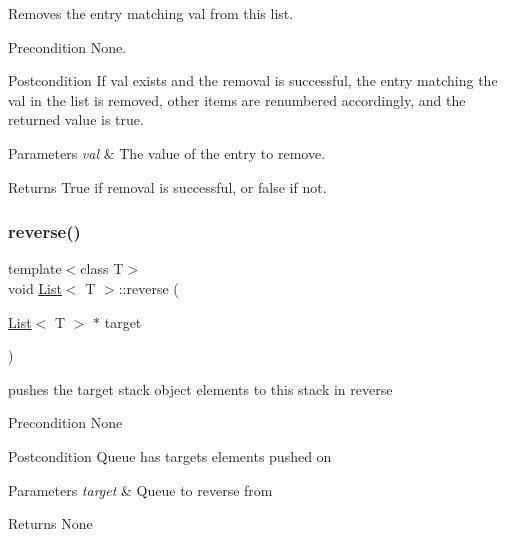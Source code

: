 Removes the entry matching val from this list. \begin{DoxyPrecond}{Precondition}
None. 
\end{DoxyPrecond}
\begin{DoxyPostcond}{Postcondition}
If val exists and the removal is successful, the entry matching the val in the list is removed, other items are renumbered accordingly, and the returned value is true. 
\end{DoxyPostcond}

\begin{DoxyParams}{Parameters}
{\em val} & The value of the entry to remove. \\
\hline
\end{DoxyParams}
\begin{DoxyReturn}{Returns}
True if removal is successful, or false if not. 
\end{DoxyReturn}
\mbox{\label{class_list_ac17012219fedb7d746f5c13501af164e}} 
\subsubsection{\texorpdfstring{reverse()}{reverse()}}
{\footnotesize\ttfamily template$<$class T$>$ \\
void \hyperlink{class_list}{List}$<$ T $>$\+::reverse (\begin{DoxyParamCaption}\item[{\hyperlink{class_list}{List}$<$ T $>$ $\ast$}]{target }\end{DoxyParamCaption})}

pushes the target stack object elements to this stack in reverse \begin{DoxyPrecond}{Precondition}
None 
\end{DoxyPrecond}
\begin{DoxyPostcond}{Postcondition}
Queue has target\textquotesingle{}s elements pushed on 
\end{DoxyPostcond}

\begin{DoxyParams}{Parameters}
{\em target} & Queue to reverse from \\
\hline
\end{DoxyParams}
\begin{DoxyReturn}{Returns}
None 
\end{DoxyReturn}
\mbox{\label{class_list_aec8852ab225094e14ad424e8d71a4dac}} 
